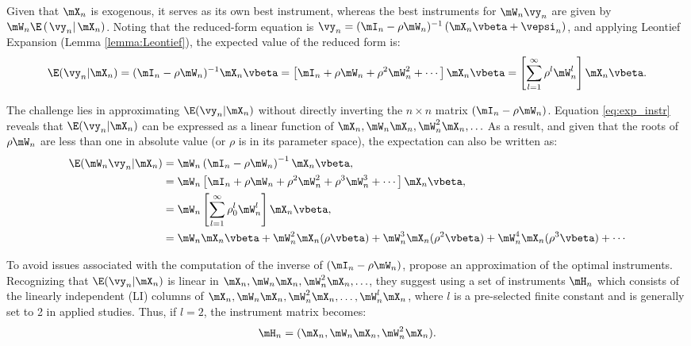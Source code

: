 \documentclass[english,12pt]{book}\usepackage[]{graphicx}\usepackage[]{xcolor}
\begin{document}
Given that $\mX_n$ is exogenous, it serves as its own best instrument, whereas the best instruments for $\mW_n\vy_n$ are given by $\mW_n\E\left(\left.\vy_n\right|\mX_n\right)$. Noting that the reduced-form equation is $\vy_n = (\mI_n - \rho\mW_n)^{-1}\left(\mX_n\vbeta + \vepsi_n \right)$, and applying Leontief Expansion (Lemma \ref{lemma:Leontief}), the expected value of the reduced form is:
\begin{equation}\label{eq:exp_instr}
  \E(\vy_n|\mX_n) = (\mI_n - \rho\mW_n)^{-1}\mX_n\vbeta = \left[\mI_n + \rho\mW_n + \rho^2\mW_n^2 + \cdots \right]\mX_n\vbeta = \left[\sum_{l = 1}^{\infty}\rho^{l}\mW^l_n\right]\mX_n\vbeta.
\end{equation}

The challenge lies in approximating  $\E(\vy_n|\mX_n)$ without directly inverting the $n\times n$ matrix $(\mI_n - \rho\mW_n)$. Equation \eqref{eq:exp_instr} reveals that $\E(\vy_n|\mX_n)$ can be expressed as a linear function of $\mX_n, \mW_n\mX_n, \mW^2_n\mX_n, \ldots$ As a result, and given that the roots of $\rho\mW_n$ are less than one in absolute value (or $\rho$ is in its parameter space), the expectation can also be written as:
\begin{equation*}
  \begin{aligned}
\E(\mW_n\vy_n|\mX_n) &  = \mW_n\left(\mI_n - \rho \mW_n\right)^{-1}\mX_n\vbeta, \\
               & = \mW_n\left[\mI_n + \rho\mW_n + \rho^2\mW^2_n + \rho^3\mW^3_n + \cdots\right]\mX_n\vbeta, \\
               & = \mW_n\left[\sum_{l = 1}^{\infty}\rho_0^{l}\mW^l_n\right]\mX_n\vbeta, \\
               & = \mW_n\mX_n\vbeta + \mW^2_n\mX_n(\rho\vbeta) + \mW^3_n\mX_n(\rho^2\vbeta) + \mW^4_n\mX_n(\rho^3\vbeta) + \cdots
  \end{aligned}
\end{equation*}

To avoid issues associated with the computation of the inverse of $(\mI_n - \rho\mW_n)$,  \cite{kelejian1998generalized, kelejian1999generalized} propose an approximation of the optimal instruments. Recognizing that $\E(\vy_n|\mX_n)$ is linear in $\mX_n, \mW_n\mX_n, \mW^2_n\mX_n, \ldots$, they suggest using a set of instruments $\mH_n$ which consists of the linearly independent (LI) columns of  $\mX_n, \mW_n\mX_n, \mW^2_n\mX_n, \ldots, \mW^l_n\mX_n$,  where $l$ is a pre-selected finite constant and is generally set to 2 in applied studies. Thus, if $l =2$, the instrument matrix becomes:
\begin{equation*}
  \mH_n = (\mX_n, \mW_n\mX_n, \mW^2_n\mX_n).
\end{equation*}
\end{document}
